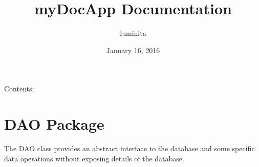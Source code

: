\documentclass[letterpaper,10pt,english]{sphinxmanual}
\title{myDocApp Documentation}
\date{January 16, 2016}
\author{luminita}
\begin{document}
\maketitle
\tableofcontents
{}\label{index::doc}


Contents:


\chapter{DAO Package}
\label{dao::doc}\label{dao:welcome-to-mydocapp-s-documentation}\label{dao:dao-package}
The DAO class provides an abstract interface to the database and some specific data operations without exposing details of the database.
\label{dao:module-doctors.dao}
\end{document}
